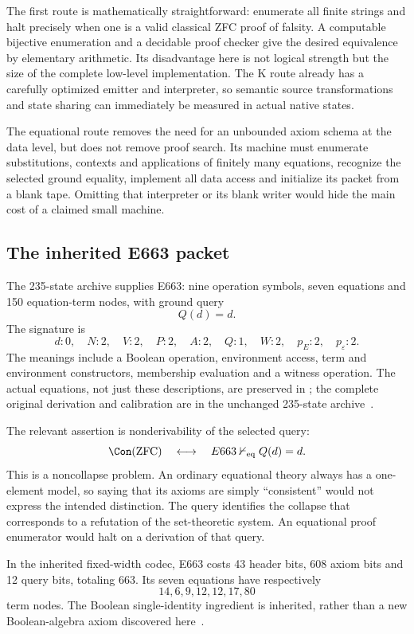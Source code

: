 The first route is mathematically straightforward: enumerate all finite
strings and halt precisely when one is a valid classical ZFC proof of
falsity. A computable bijective enumeration and a decidable proof checker
give the desired equivalence by elementary arithmetic. Its disadvantage
here is not logical strength but the size of the complete low-level
implementation. The K route already has a carefully optimized emitter
and interpreter, so semantic source transformations and state sharing
can immediately be measured in actual native states.

The equational route removes the need for an unbounded axiom schema at
the data level, but does not remove proof search. Its machine must
enumerate substitutions, contexts and applications of finitely many
equations, recognize the selected ground equality, implement all data
access and initialize its packet from a blank tape. Omitting that
interpreter or its blank writer would hide the main cost of a claimed
small machine.

\subsection{The inherited E663 packet}

The 235-state archive supplies E663: nine operation symbols, seven
equations and 150 equation-term nodes, with ground query
\[
                          Q(d)=d.
\]
The signature is
\[
 d:0,\quad N:2,\quad V:2,\quad P:2,\quad A:2,\quad Q:1,
 \quad W:2,\quad p_E:2,\quad p_\varepsilon:2.
\]
The meanings include a Boolean operation, environment access, term and
environment constructors, membership evaluation and a witness operation.
The actual equations, not just these descriptions, are preserved in
; the complete original derivation and
calibration are in the unchanged 235-state archive~\cite{proveit235}.

The relevant assertion is nonderivability of the selected query:
\[
        \Con(\mathrm{ZFC})\quad\longleftrightarrow\quad
                  E663\nvdash_{\mathrm{eq}}Q(d)=d.
\]
This is a noncollapse problem. An ordinary equational theory always has
a one-element model, so saying that its axioms are simply ``consistent''
would not express the intended distinction. The query identifies the
collapse that corresponds to a refutation of the set-theoretic system.
An equational proof enumerator would halt on a derivation of that query.

In the inherited fixed-width codec, E663 costs 43 header bits,
608 axiom bits and 12 query bits, totaling 663. Its seven equations have
respectively
\[
                         14,6,9,12,12,17,80
\]
term nodes. The Boolean single-identity ingredient is inherited, rather
than a new Boolean-algebra axiom discovered here~\cite{mccune}.


